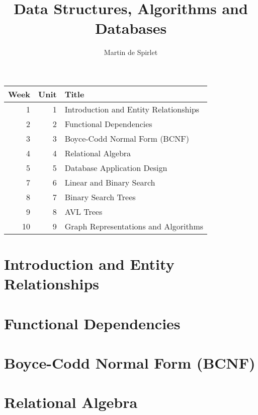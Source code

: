 \documentclass[
  11pt,
  a4paper,
]{article}
\title{Data Structures, Algorithms and Databases}
\author{Martin de Spirlet}
\date{}
\begin{document}

\maketitle

\vspace*{\fill}

\begin{table}[htp]
  \centering
  \begin{tabular}{rrl}
    \toprule
    Week & Unit & Title \\
    \midrule
     1 & 1 & Introduction and Entity Relationships \\
     2 & 2 & Functional Dependencies \\
     3 & 3 & Boyce-Codd Normal Form (BCNF) \\
     4 & 4 & Relational Algebra \\
     5 & 5 & Database Application Design \\
     7 & 6 & Linear and Binary Search \\
     8 & 7 & Binary Search Trees \\
     9 & 8 & AVL Trees \\
    10 & 9 & Graph Representations and Algorithms \\
    \bottomrule
  \end{tabular}
\end{table}

\vspace*{\fill}
\addvspace{1in}

\clearpage


\section{Introduction and Entity Relationships}


\section{Functional Dependencies}


\section{Boyce-Codd Normal Form (BCNF)}


\section{Relational Algebra}

\end{document}
